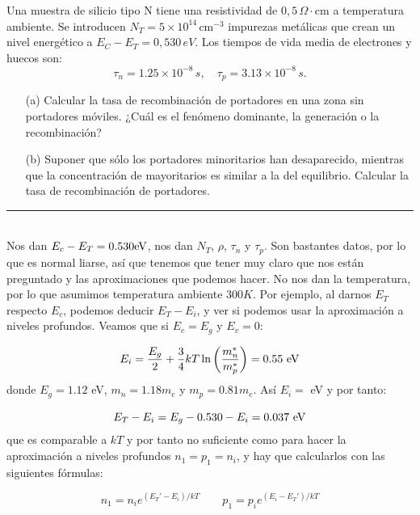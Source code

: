 Una muestra de silicio tipo N tiene una resistividad de \(0,5 \, \Omega \cdot \text{cm}\) a temperatura ambiente. Se introducen \(N_T = 5 \times 10^{14} \, \text{cm}^{-3}\) impurezas metálicas que crean un nivel energético a \(E_C - E_T = 0,530 \, eV\). Los tiempos de vida media de electrones y huecos son:
\[
	\tau_n = 1.25 \times 10^{-8} \, s, \quad \tau_p = 3.13 \times 10^{-8} \, s.
\]
\begin{itemize}
	\item[(a)] Calcular la tasa de recombinación de portadores en una zona sin portadores móviles. ¿Cuál es el fenómeno dominante, la generación o la recombinación?
	\item[(b)] Suponer que sólo los portadores minoritarios han desaparecido, mientras que la concentración de mayoritarios es similar a la del equilibrio. Calcular la tasa de recombinación de portadores.
\end{itemize}


\rule{\textwidth}{0.1pt} \\[2pt]



Nos dan $E_c-E_T=0.530\text{eV}$, nos dan $N_T$, $\rho$, $\tau_n$ y $\tau_p$. Son bastantes datos, por lo que es normal liarse, así que tenemos que tener muy claro que nos están preguntado y las aproximaciones que podemos hacer. No nos dan la temperatura, por lo que asumimos temperatura ambiente $300K$. Por ejemplo, al darnos $E_T$ respecto $E_c$, podemos deducir $E_T-E_i$, y ver si podemos usar la aproximación a niveles profundos. Veamos que si $E_c=E_g$ y $E_v=0$:
	
\begin{equation}
	E_i = \frac{E_g}{2} + \frac{3}{4} kT \ln \left( \frac{m_n^*}{m_p^*} \right) = 0.55 \ \text{eV}
\end{equation}
donde $E_g=1.12$ eV, $m_n=1.18m_e$ y $m_p=0.81m_e$. Así $E_i=$ eV y por tanto:

\begin{equation}
	E_T - E_i = E_g - 0.530 - E_i =0.037 \ \eV		
\end{equation}
que es comparable a $kT$ y por tanto no suficiente como para hacer la aproximación a niveles profundos $n_1=p_1=n_i$, y hay que calcularlos con las siguientes fórmulas:

\begin{equation}
	n_1 = n_i e^{(E_T'-E_i)/kT} 	\qquad 
	p_1 = p_i e^{(E_i-E_T')/kT}
\end{equation}

